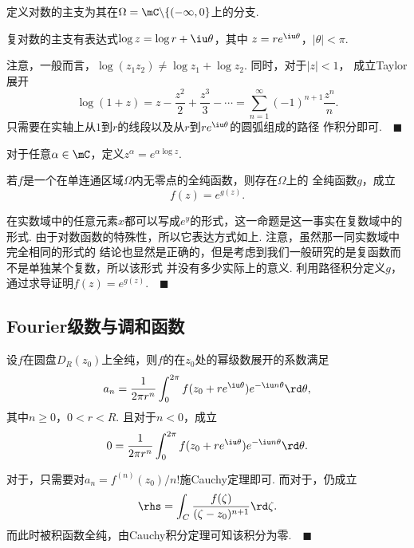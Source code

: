   \begin{defi}[主支]
    \label{defi: 复对数主支}
    定义对数的主支为其在$\Omega = \mC\backslash\{(-\infty, 0\}$上的分支.
  \end{defi}

  \begin{thm}[主支]
    复对数的主支有表达式$\log z = \log r + \iu\theta$，其中
    $z=re^{\iu\theta}$，$|\theta|<\pi$.
  \end{thm}
  \remark
    注意，一般而言，$\log(z_1z_2)\ne \log z_1 + \log z_2$. 同时，对于$|z|<1$，
    成立Taylor展开
    \[
      \log(1+z) = z-\frac{z^2}{2}+\frac{z^3}{3} - \cdots = 
      \sum_{n=1}^\infty (-1)^{n+1}\frac{z^n}{n}.
    \]
  \proof
    只需要在实轴上从$1$到$r$的线段以及从$r$到$re^{\iu\theta}$的圆弧组成的路径
    作积分即可.$\quad\blacksquare$

  \begin{defi}[指数]
    对于任意$\alpha\in\mC$，定义$z^\alpha = e^{\alpha\log z}$.
  \end{defi}

  \begin{thm}
    \label{thm: 全纯、对数存在性}
    若$f$是一个在单连通区域$\Omega$内无零点的全纯函数，则存在$\Omega$上的
    全纯函数$g$，成立
    \[
      f(z) = e^{g(z)}.
    \]
  \end{thm}
  \remark
    在实数域中的任意元素$x$都可以写成$e^y$的形式，这一命题是这一事实在复数域中的形式.
    由于对数函数的特殊性，所以它表达方式如上. 注意，虽然那一同实数域中完全相同的形式的
    结论也显然是正确的，但是考虑到我们一般研究的是复函数而不是单独某个复数，所以该形式
    并没有多少实际上的意义.
  \proof
    利用路径积分定义$g$，通过求导证明$f(z)=e^{g(z)}$.$\quad\blacksquare$


\subsection{Fourier级数与调和函数}

  \begin{thm}
    \label{thm: 幂级数系数、积分}
    设$f$在圆盘$D_R(z_0)$上全纯，则$f$的在$z_0$处的幂级数展开的系数满足
    \begin{equation}
      \label{equ: 幂级数系数}
      a_n = \frac{1}{2\pi r^n}\int_0^{2\pi}f(z_0+re^{\iu\theta})e^{-\iu n\theta}\rd\theta,
    \end{equation}
    其中$n\ge 0$，$0<r<R$. 且对于$n<0$，成立
    \begin{equation}
      \label{equ: 幂级数系数2}
      0 = \frac{1}{2\pi r^n}\int_0^{2\pi}f(z_0+re^{\iu\theta})e^{-\iu n\theta}\rd\theta.
    \end{equation}
  \end{thm}
  \proof
    对于，只需要对$a_n = f^{(n)}(z_0)/n!$施Cauchy定理即可.
    而对于，仍成立
    \[
      \rhs = \int_C\frac{f(\zeta)}{(\zeta-z_0)^{n+1}}\rd\zeta.
    \]
    而此时被积函数全纯，由Cauchy积分定理可知该积分为零.$\quad\blacksquare$

